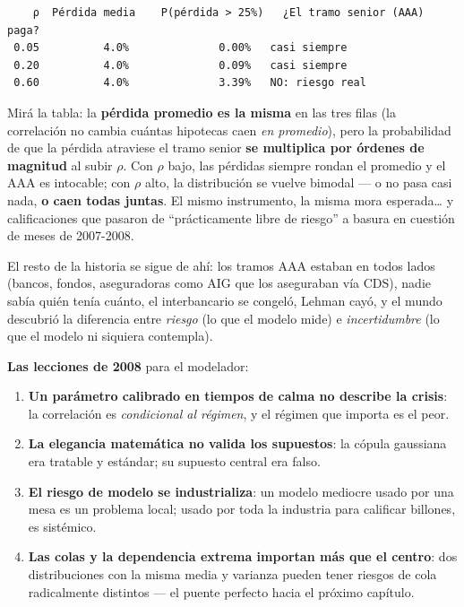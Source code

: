 \documentclass[
  spanish,
  letterpaper,
  DIV=11,
  numbers=noendperiod]{scrreprt}
\providecommand{\tightlist}{%
  \setlength{\itemsep}{0pt}\setlength{\parskip}{0pt}}
\begin{document}
\begin{verbatim}
    ρ  Pérdida media    P(pérdida > 25%)   ¿El tramo senior (AAA) paga?
 0.05          4.0%              0.00%   casi siempre
 0.20          4.0%              0.09%   casi siempre
 0.60          4.0%              3.39%   NO: riesgo real
\end{verbatim}

Mirá la tabla: la \textbf{pérdida promedio es la misma} en las tres
filas (la correlación no cambia cuántas hipotecas caen \emph{en
promedio}), pero la probabilidad de que la pérdida atraviese el tramo
senior \textbf{se multiplica por órdenes de magnitud} al subir \(\rho\).
Con \(\rho\) bajo, las pérdidas siempre rondan el promedio y el AAA es
intocable; con \(\rho\) alto, la distribución se vuelve bimodal --- o no
pasa casi nada, \textbf{o caen todas juntas}. El mismo instrumento, la
misma mora esperada\ldots{} y calificaciones que pasaron de
``prácticamente libre de riesgo'' a basura en cuestión de meses de
2007-2008.

El resto de la historia se sigue de ahí: los tramos AAA estaban en todos
lados (bancos, fondos, aseguradoras como AIG que los aseguraban vía
CDS), nadie sabía quién tenía cuánto, el interbancario se congeló,
Lehman cayó, y el mundo descubrió la diferencia entre \emph{riesgo} (lo
que el modelo mide) e \emph{incertidumbre} (lo que el modelo ni siquiera
contempla).

\textbf{Las lecciones de 2008} para el modelador:

\begin{enumerate}
\def\labelenumi{\arabic{enumi}.}
\tightlist
\item
  \textbf{Un parámetro calibrado en tiempos de calma no describe la
  crisis}: la correlación es \emph{condicional al régimen}, y el régimen
  que importa es el peor.
\item
  \textbf{La elegancia matemática no valida los supuestos}: la cópula
  gaussiana era tratable y estándar; su supuesto central era falso.
\item
  \textbf{El riesgo de modelo se industrializa}: un modelo mediocre
  usado por una mesa es un problema local; usado por toda la industria
  para calificar billones, es sistémico.
\item
  \textbf{Las colas y la dependencia extrema importan más que el
  centro}: dos distribuciones con la misma media y varianza pueden tener
  riesgos de cola radicalmente distintos --- el puente perfecto hacia el
  próximo capítulo.
\end{enumerate}
\end{document}

